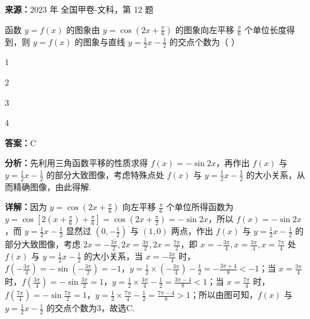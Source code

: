 \begin{question}[points=5]
\textbf{来源：}2023 年 全国甲卷-文科，第 12 题\par
函数 $y=f(x)$ 的图象由 $y=\cos\left(2x+\frac{\pi}{6}\right)$ 的图象向左平移 $\frac{\pi}{6}$ 个单位长度得到，则 $y=f(x)$ 的图象与直线 $y=\frac{1}{2}x-\frac{1}{2}$ 的交点个数为（    ）
\begin{choices}
  \item $1$
  \item $2$
  \item $3$
  \item $4$
\end{choices}
\begin{solution}
\textbf{答案：}C

\textbf{分析：}先利用三角函数平移的性质求得 $f(x)=-\sin2x$，再作出 $f(x)$ 与 $y=\frac{1}{2}x-\frac{1}{2}$ 的部分大致图像，考虑特殊点处 $f(x)$ 与 $y=\frac{1}{2}x-\frac{1}{2}$ 的大小关系，从而精确图像，由此得解.

\textbf{详解：}因为 $y=\cos\left(2x+\frac{\pi}{6}\right)$ 向左平移 $\frac{\pi}{6}$ 个单位所得函数为 $y=\cos\left[2(x+\frac{\pi}{6})+\frac{\pi}{6}\right]=\cos\left(2x+\frac{\pi}{2}\right)=-\sin2x$，所以 $f(x)=-\sin2x$，而 $y=\frac{1}{2}x-\frac{1}{2}$ 显然过 $(0,-\frac{1}{2})$ 与 $(1,0)$ 两点，作出 $f(x)$ 与 $y=\frac{1}{2}x-\frac{1}{2}$ 的部分大致图像，考虑 $2x=-\frac{3\pi}{2},2x=\frac{3\pi}{2},2x=\frac{7\pi}{2}$，即 $x=-\frac{3\pi}{4},x=\frac{3\pi}{4},x=\frac{7\pi}{4}$ 处 $f(x)$ 与 $y=\frac{1}{2}x-\frac{1}{2}$ 的大小关系，当 $x=-\frac{3\pi}{4}$ 时，$f(-\frac{3\pi}{4})=-\sin(-\frac{3\pi}{2})=-1$，$y=\frac{1}{2}\times(-\frac{3\pi}{4})-\frac{1}{2}=-\frac{3\pi+4}{8}<-1$；当 $x=\frac{3\pi}{4}$ 时，$f(\frac{3\pi}{4})=-\sin\frac{3\pi}{2}=1$，$y=\frac{1}{2}\times\frac{3\pi}{4}-\frac{1}{2}=\frac{3\pi-4}{8}<1$；当 $x=\frac{7\pi}{4}$ 时，$f(\frac{7\pi}{4})=-\sin\frac{7\pi}{2}=1$，$y=\frac{1}{2}\times\frac{7\pi}{4}-\frac{1}{2}=\frac{7\pi-4}{8}>1$；所以由图可知，$f(x)$ 与 $y=\frac{1}{2}x-\frac{1}{2}$ 的交点个数为3，故选C.
\end{solution}
\end{question}


